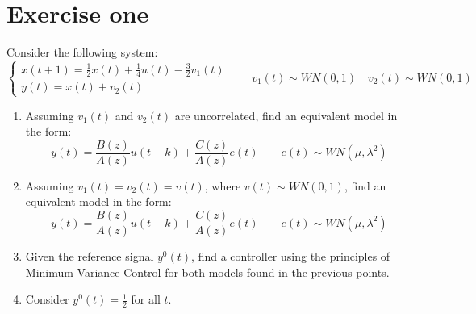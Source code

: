 \section{Exercise one}

Consider the following system:
\[\begin{cases}
    x(t+1)=\frac{1}{2}x(t)+\frac{1}{4}u(t)-\frac{3}{2}v_1(t) \\
    y(t)=x(t)+v_2(t)
\end{cases} \qquad v_1(t)\sim WN(0,1) \quad v_2(t)\sim WN(0,1)\]
\begin{enumerate}
    \item Assuming $v_1(t)$ and $v_2(t)$ are uncorrelated, find an equivalent model in the form:
        \[y(t)=\frac{B(z)}{A(z)}u(t-k)+\frac{C(z)}{A(z)}e(t) \qquad e(t)\sim WN(\mu,\lambda^2)\]
    \item Assuming $v_1(t)=v_2(t)=v(t)$, where $v(t)\sim WN(0,1)$, find an equivalent model in the form:
        \[y(t)=\frac{B(z)}{A(z)}u(t-k)+\frac{C(z)}{A(z)}e(t) \qquad e(t)\sim WN(\mu,\lambda^2)\]
    \item Given the reference signal $y^0(t)$, find a controller using the principles of Minimum Variance Control for both models found in the previous points.
    \item Consider $y^0(t)=\frac{1}{2}$ for all $t$.
\end{enumerate}

